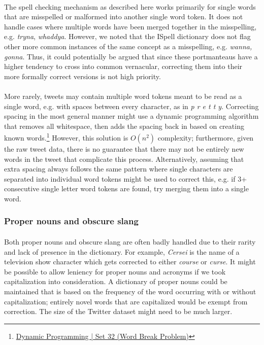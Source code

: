 \documentclass[twocolumn,10pt]{article}
\begin{document}
\paragraph{} The spell checking mechanism as described here works primarily for single words that are misspelled or malformed into another single word token. It does not handle cases where multiple words have been merged together in the misspelling, e.g. \textit{tryna}, \textit{whaddya}. However, we noted that the ISpell dictionary does not flag other more common instances of the same concept as a misspelling, e.g. \textit{wanna, gonna}. Thus, it could potentially be argued that since these portmanteaus have a higher tendency to cross into common vernacular, correcting them into their more formally correct versions is not high priority.
\paragraph{} More rarely, tweets may contain multiple word tokens meant to be read as a single word, e.g. with spaces between every character, as in \textit{p r e t t y}. Correcting spacing in the most general manner might use a dynamic programming algorithm that removes all whitespace, then adds the spacing back in based on creating known words.\footnote{\href{http://www.geeksforgeeks.org/dynamic-programming-set-32-word-break-problem/}{Dynamic Programming | Set 32 (Word Break Problem)}} However, this solution is $O(n^2)$ complexity; furthermore, given the raw tweet data, there is no guarantee that there may not be entirely new words in the tweet that complicate this process. Alternatively, assuming that extra spacing always follows the same pattern where single characters are separated into individual word tokens might be used to correct this, e.g. if 3+ consecutive single letter word tokens are found, try merging them into a single word.
\subsubsection*{Proper nouns and obscure slang}
\paragraph{} Both proper nouns and obscure slang are often badly handled due to their rarity and lack of presence in the dictionary. For example, \textit{Cersei} is the name of a television show character which gets corrected to either \textit{course} or \textit{curse}. It might be possible to allow leniency for proper nouns and acronyms if we took capitalization into consideration. A dictionary of proper nouns could be maintained that is based on the frequency of the word occurring with or without capitalization; entirely novel words that are capitalized would be exempt from correction. The size of the Twitter dataset might need to be much larger.
\end{document}
